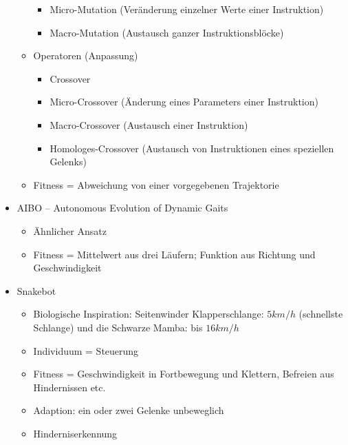 \begin{itemize}
\begin{itemize}
\begin{itemize}
			\item Micro-Mutation (Veränderung einzelner Werte einer Instruktion)
			\item Macro-Mutation (Austausch ganzer Instruktionsblöcke)
		\end{itemize}
		\item Operatoren (Anpassung)
		\begin{itemize}
			\item Crossover
			\item Micro-Crossover (Änderung eines Parameters einer Instruktion)
			\item Macro-Crossover (Austausch einer Instruktion)
			\item Homologes-Crossover (Austausch von Instruktionen eines speziellen Gelenks)
		\end{itemize}
		\item Fitness = Abweichung von einer vorgegebenen Trajektorie
	\end{itemize}
	\item AIBO -- Autonomous Evolution of Dynamic Gaits
	\begin{itemize}
		\item Ähnlicher Ansatz 
		\item Fitness = Mittelwert aus drei Läufern; Funktion aus Richtung und Geschwindigkeit
	\end{itemize}
	\item Snakebot
	\begin{itemize}
		\item Biologische Inspiration: Seitenwinder Klapperschlange: $5 km/h$ (schnellste Schlange) und die Schwarze Mamba: bis $16 km/h$
		\item Individuum = Steuerung
		\item Fitness = Geschwindigkeit in Fortbewegung und Klettern, Befreien aus Hindernissen etc.\
		\item Adaption: ein oder zwei Gelenke unbeweglich
		\item Hinderniserkennung
	\end{itemize}
\end{itemize}

